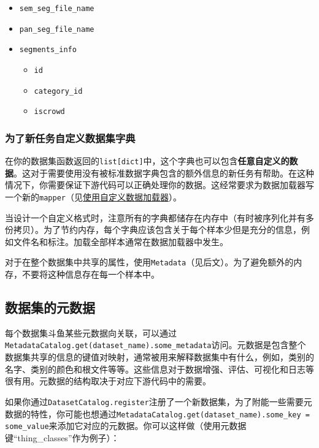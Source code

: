 \documentclass[../main.tex]{subfile}
\begin{document}
\begin{itemize}
\begin{itemize}
          \end{itemize}
    \item \lstinline{sem_seg_file_name}
    \item \lstinline{pan_seg_file_name}
    \item \lstinline{segments_info}
          \begin{itemize}
              \item \lstinline{id}
              \item \lstinline{category_id}
              \item \lstinline{iscrowd}
          \end{itemize}
\end{itemize}

\subsubsection{为了新任务自定义数据集字典}

在你的数据集函数返回的\lstinline{list[dict]}中，这个字典也可以包含\textbf{任意自定义的数据}。这对于需要使用没有被标准数据字典包含的额外信息的新任务有帮助。在这种情况下，你需要保证下游代码可以正确处理你的数据。这经常要求为数据加载器写一个新的\lstinline{mapper}（见\href{https://detectron2.readthedocs.io/en/latest/tutorials/data_loading.html}{使用自定义数据加载器}）。

当设计一个自定义格式时，注意所有的字典都储存在内存中（有时被序列化并有多份拷贝）。为了节约内存，每个字典应该包含关于每个样本少但是充分的信息，例如文件名和标注。加载全部样本通常在数据加载器中发生。

对于在整个数据集中共享的属性，使用\lstinline{Metadata}（见后文）。为了避免额外的内存，不要将这种信息存在每一个样本中。

\subsection{数据集的元数据}

每个数据集斗鱼某些元数据向关联，可以通过\lstinline{MetadataCatalog.get(dataset_name).some_metadata}访问。元数据是包含整个数据集共享的信息的键值对映射，通常被用来解释数据集中有什么，例如，类别的名字、类别的颜色和根文件等等。这些信息对于数据增强、评估、可视化和日志等很有用。元数据的结构取决于对应下游代码中的需要。

如果你通过\lstinline{DatasetCatalog.register}注册了一个新数据集，为了附能一些需要元数据的特性，你可能也想通过\lstinline{MetadataCatalog.get(dataset_name).some_key = some_value}来添加它对应的元数据。你可以这样做（使用元数据键“thing\_classes”作为例子）：
\end{document}

